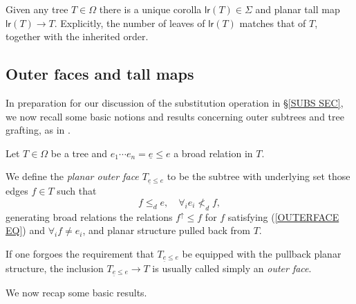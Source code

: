 \documentclass[a4paper,10pt]{article}%
\begin{document}
\begin{remark}\label{UNIQCOR REM}
	Given any tree $T \in \Omega$ there is a unique corolla $\mathsf{lr}(T) \in \Sigma$ and planar tall map 
	$\mathsf{lr}(T) \to T$.
	Explicitly, the number of leaves of $\mathsf{lr}(T)$ matches that of $T$, together with the inherited order. 
\end{remark}


\subsection{Outer faces and tall maps}\label{OUTTALL SEC}



In preparation for our discussion of the substitution operation in \S \ref{SUBS SEC}, we now recall some basic notions and results concerning outer subtrees and tree grafting, as in \cite[\S5]{Pe16b}.

\begin{definition}
	Let $T \in \Omega$ be a tree and 
	$e_1 \cdots e_n =\underline{e} \leq e$ a broad relation in $T$.
	
	We define the \textit{planar outer face $T_{\underline{e} \leq e}$}
	to be the subtree with underlying set those edges $f \in T$ such that
\begin{equation}\label{OUTERFACE EQ}
	f \leq_d e,\quad \forall_i e_i \nless_d f,
\end{equation}
generating broad relations the relations $f^{\uparrow} \leq f$ for $f$ satisfying (\ref{OUTERFACE EQ}) and $\forall_i f\neq e_i$,
and planar structure pulled back from $T$.
\end{definition}


\begin{remark}
If one forgoes the requirement that $T_{\underline{e} \leq e}$ be equipped with the pullback planar structure, the inclusion $T_{\underline{e} \leq e} \to T$ is usually called simply an \textit{outer face}.
\end{remark}

We now recap some basic results.
\end{document}
